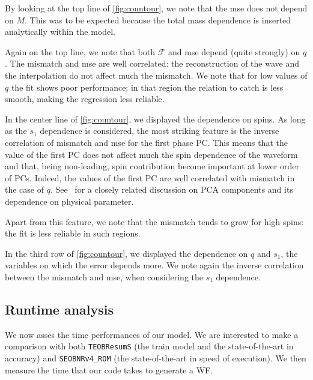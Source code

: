 \par
By looking at the top line of \ref{fig:countour}, we note that the mse does not depend on $M$. This was to be expected because the total mass dependence is inserted analytically within the model.
\par
Again on the top line, we note that both $\mathcal{F}$ and mse depend (quite strongly) on $q$.
The mismatch and mse are well correlated: the reconstruction of the wave and the interpolation do not affect much the mismatch.
We note that for low values of $q$ the fit shows poor performance: in that region the relation to catch is less smooth, making the regression less reliable.
\par
In the center line of \ref{fig:countour}, we displayed the dependence on spins.
As long as the $s_1$ dependence is considered, the most striking feature is the inverse correlation of mismatch and mse for the first phase PC.
This means that the value of the first PC does not affect much the spin dependence of the waveform and that, being non-leading, spin contribution become important at lower order of PCs.
Indeed, the values of the first PC are well correlated with mismatch in the case of $q$. See~\cite{Ohme2013PCA_GW} for a closely related discussion on PCA components and its dependence on physical parameter.
\par
Apart from this feature, we note that the mismatch tends to grow for high spins: the fit is less reliable in such regions.
\par
In the third row of \ref{fig:countour}, we displayed the dependence on $q$ and $s_1$, the variables on which the error depends more.
We note again the inverse correlation between the mismatch and mse, when considering the $s_1$ dependence.
\subsection{Runtime analysis} \label{sec:runtime}
We now asses the time performances of our model.
We are interested to make a comparison with both \texttt{TEOBResumS} (the train model and the state-of-the-art in accuracy) and \texttt{SEOBNRv4\_ROM} \cite{} (the state-of-the-art in speed of execution).
We then measure the time that our code takes to generate a WF.
